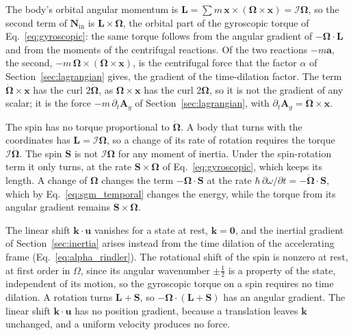 \documentclass[aps,prd,onecolumn,tightenlines,nofootinbib,notitlepage,11pt,floatfix]{revtex4-2}
\theoremstyle{indentedtheorem}
\begin{document}
The body's orbital angular momentum is $\mathbf{L}=\sum m\,\mathbf{x}\times(\boldsymbol{\Omega}\times\mathbf{x})=\mathcal{I}\boldsymbol{\Omega}$, so the second term of $\mathbf{N}_\text{in}$ is $\mathbf{L}\times\boldsymbol{\Omega}$, the orbital part of the gyroscopic torque of Eq.~\eqref{eq:gyroscopic}: the same torque follows from the angular gradient of $-\boldsymbol{\Omega}\cdot\mathbf{L}$ and from the moments of the centrifugal reactions. Of the two reactions $-m\mathbf{a}$, the second, $-m\,\boldsymbol{\Omega}\times(\boldsymbol{\Omega}\times\mathbf{x})$, is the centrifugal force that the factor $\alpha$ of Section~\ref{sec:lagrangian} gives, the gradient of the time-dilation factor. The term $\dot{\boldsymbol{\Omega}}\times\mathbf{x}$ has the curl $2\dot{\boldsymbol{\Omega}}$, as $\boldsymbol{\Omega}\times\mathbf{x}$ has the curl $2\boldsymbol{\Omega}$, so it is not the gradient of any scalar; it is the force $-m\,\partial_t\mathbf{A}_g$ of Section~\ref{sec:lagrangian}, with $\partial_t\mathbf{A}_g=\dot{\boldsymbol{\Omega}}\times\mathbf{x}$.

The spin has no torque proportional to $\dot{\boldsymbol{\Omega}}$. A body that turns with the coordinates has $\mathbf{L}=\mathcal{I}\boldsymbol{\Omega}$, so a change of its rate of rotation requires the torque $\mathcal{I}\dot{\boldsymbol{\Omega}}$. The spin $\mathbf{S}$ is not $\mathcal{I}\boldsymbol{\Omega}$ for any moment of inertia. Under the spin-rotation term it only turns, at the rate $\mathbf{S}\times\boldsymbol{\Omega}$ of Eq.~\eqref{eq:gyroscopic}, which keeps its length. A change of $\boldsymbol{\Omega}$ changes the term $-\boldsymbol{\Omega}\cdot\mathbf{S}$ at the rate $\hbar\,\partial\omega/\partial t=-\dot{\boldsymbol{\Omega}}\cdot\mathbf{S}$, which by Eq.~\eqref{eq:sgm_temporal} changes the energy, while the torque from its angular gradient remains $\mathbf{S}\times\boldsymbol{\Omega}$.

The linear shift $\mathbf{k}\cdot\mathbf{u}$ vanishes for a state at rest, $\mathbf{k}=\mathbf{0}$, and the inertial gradient of Section~\ref{sec:inertia} arises instead from the time dilation of the accelerating frame (Eq.~\eqref{eq:alpha_rindler}). The rotational shift of the spin is nonzero at rest, at first order in $\Omega$, since its angular wavenumber $\pm\tfrac{1}{2}$ is a property of the state, independent of its motion, so the gyroscopic torque on a spin requires no time dilation. A rotation turns $\mathbf{L}+\mathbf{S}$, so $-\boldsymbol{\Omega}\cdot(\mathbf{L}+\mathbf{S})$ has an angular gradient. The linear shift $\mathbf{k}\cdot\mathbf{u}$ has no position gradient, because a translation leaves $\mathbf{k}$ unchanged, and a uniform velocity produces no force.
\end{document}
